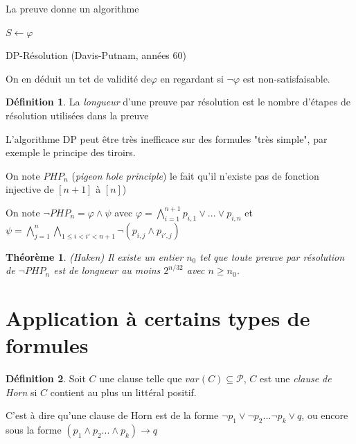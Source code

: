 \documentclass[]{article}
\newtheorem{mythm}{Théorème}
\theoremstyle{remark}
\theoremstyle{definition}
\newtheorem{mydef}{Définition}
\begin{document}
La preuve donne un algorithme

\begin{algorithm}
	$S \leftarrow \varphi$ \\
	
	\caption{DP-Résolution (Davis-Putnam, années 60)}
\end{algorithm}

On en déduit un tet de validité de$\varphi$ en regardant si $\neg \varphi$ est non-satisfaisable.

\begin{mydef}
	La \textit{longueur} d'une preuve par résolution est le nombre d'étapes de résolution utilisées dans la preuve
\end{mydef}

L'algorithme DP peut être très inefficace sur des formules "très simple", par exemple le principe des tiroirs.

On note $PHP_n$ (\textit{pigeon hole principle}) le fait qu'il n'existe pas de fonction injective de $[n+1]$ à $[n]$)

On note $\neg PHP_n = \varphi \land \psi$ avec $\varphi = \bigwedge_{i = 1}^{n+1} p_{i,1} \lor ... \lor p_{i, n}$ et $\psi = \bigwedge_{j=1}^n \bigwedge_{1 \leqslant i < i' < n+1} \neg (p_{i,j} \land p_{i',j})$

\begin{mythm}(Haken)
	Il existe un entier $n_0$ tel que toute preuve par résolution de $\neg PHP_n$ est de longueur au moins $2^{n/32}$ avec $n \geqslant n_0$.
\end{mythm}

\section{Application à certains types de formules}

\begin{mydef}
	Soit $C$ une clause telle que $var(C) \subseteq \mathcal{P}$, $C$ est une \textit{clause de Horn} si $C$ contient au plus un littéral positif.
	
	C'est à dire qu'une clause de Horn est de la forme $\neg p_1 \lor \neg p_2 ... \neg p_k \lor q$, ou encore sous la forme $(p_1 \land p_2 ... \land p_k) \rightarrow q$
\end{mydef}
\end{document}
